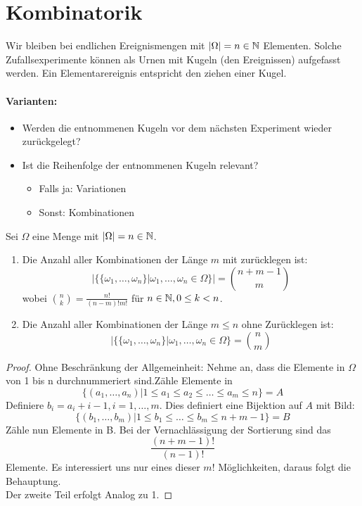 \section{Kombinatorik}
Wir bleiben bei endlichen Ereignismengen mit $|\Omega|= n \in \mathbb{N}$ Elementen. Solche Zufallsexperimente können als Urnen mit Kugeln (den Ereignissen) aufgefasst werden. Ein Elementarereignis entspricht den ziehen einer Kugel. \\
\paragraph{Varianten:}
\begin{itemize}
	\item Werden die entnommenen Kugeln vor dem nächsten Experiment wieder zurückgelegt?
	\item Ist die Reihenfolge der entnommenen Kugeln relevant?
		\begin{itemize}
			\item Falls ja: Variationen
			\item Sonst: Kombinationen
		\end{itemize}
\end{itemize}
\begin{theorem}
	Sei $\Omega$ eine Menge mit $|\Omega| = n \in \mathbb{N}$.
	\begin{enumerate}[label=\arabic*)]
		\item Die Anzahl aller Kombinationen der Länge $m$ mit zurücklegen ist:
			\[
				| \{\{\omega_1,\ldots,\omega_n\}| \omega_1,\ldots, \omega_n \in \Omega \}| = {n+m-1 \choose m} 
			\]
			wobei ${n \choose k} = \frac{n!}{(n-m)!m!}$ für $n \in \mathbb{N}, 0\le k <n$.
		\item Die Anzahl aller Kombinationen der Länge $m\le n$ ohne Zurücklegen ist:
			\[
				| \{\{\omega_1,\ldots,\omega_n\} | \omega_1, \ldots, \omega_n \in \Omega\} = {n \choose m}
			\]
	\end{enumerate}

\end{theorem}
\begin{proof}
Ohne Beschränkung der Allgemeinheit: Nehme an, dass die Elemente in $\Omega$ von 1 bis n durchnummeriert sind.Zähle Elemente in 
\[
\{(a_1,\ldots,a_n) | 1\le a_1\le a_2 \le \ldots \le a_m \le n\} = A 
\]
Definiere $b_i = a_i + i-1, i = 1, \ldots, m$. Dies definiert eine Bijektion auf $A$ mit Bild:
\[
\{(b_1,\ldots,b_m) | 1\le b_1\le \ldots\le b_m\le n+m-1\}=B 
\]
Zähle nun Elemente in B. Bei der Vernachlässigung der Sortierung sind das
\[
	\frac{(n+m-1)!}{(n-1)!}
\]
Elemente. Es interessiert uns nur eines dieser $m!$ Möglichkeiten, daraus folgt die Behauptung. \\
Der zweite Teil erfolgt Analog zu 1.
\end{proof}
